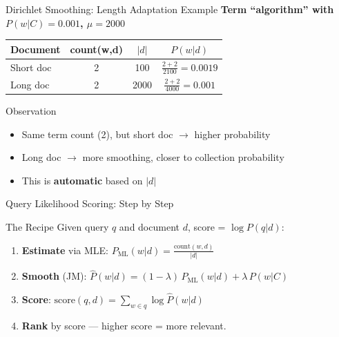 \documentclass[aspectratio=169]{beamer}
\newif\ifanimated
\newcommand{\cpause}{\ifanimated\pause\fi}
\begin{document}
\begin{frame}{Dirichlet Smoothing: Length Adaptation Example}
\textbf{Term ``algorithm'' with $P(w|C) = 0.001$, $\mu = 2000$}

\vspace{1em}

\begin{table}
\centering
\begin{tabular}{lccc}
\toprule
\textbf{Document} & \textbf{count(w,d)} & \textbf{$|d|$} & \textbf{$P(w|d)$} \\
\midrule
Short doc & 2 & 100 & $\frac{2 + 2}{2100} = 0.0019$ \\
Long doc & 2 & 2000 & $\frac{2 + 2}{4000} = 0.001$ \\
\bottomrule
\end{tabular}
\end{table}

\vspace{1em}

\begin{block}{Observation}
\begin{itemize}
    \item Same term count (2), but short doc $\to$ higher probability
    \item Long doc $\to$ more smoothing, closer to collection probability
    \item This is \textbf{automatic} based on $|d|$
\end{itemize}\cpause
\end{block}
\end{frame}


\begin{frame}{Query Likelihood Scoring: Step by Step}
\begin{exampleblock}{The Recipe}
Given query $q$ and document $d$, score = $\log P(q|d)$:
\end{exampleblock}

\vspace{0.4em}

\begin{enumerate}
    \item \textbf{Estimate} via MLE: $\displaystyle P_{\text{ML}}(w|d) = \frac{\text{count}(w,d)}{|d|}$\cpause
    \cpause
    \vspace{0.2em}
    \item \textbf{Smooth} (JM): $\hat{P}(w|d) = (1-\lambda)\,P_{\text{ML}}(w|d) + \lambda\,P(w|C)$\cpause
    \cpause
    \vspace{0.2em}
    \item \textbf{Score}: $\displaystyle\text{score}(q,d) = \sum_{w \in q} \log \hat{P}(w|d)$\cpause
    \cpause
    \vspace{0.2em}
    \item \textbf{Rank} by score --- higher score = more relevant.\cpause
\end{enumerate}

\end{frame}
\end{document}
